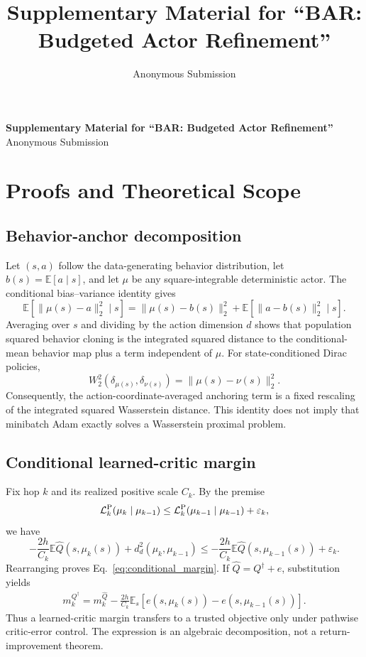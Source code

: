 \documentclass[letterpaper]{article}
\title{Supplementary Material for ``BAR: Budgeted Actor Refinement''}
\author{Anonymous Submission}
\newcommand{\E}{\mathbb E}
\begin{document}
\onecolumn
\begin{center}
{\Large\bfseries Supplementary Material for ``BAR: Budgeted Actor Refinement''}\\[.4em]
{\normalsize Anonymous Submission}
\end{center}
\vspace{1em}

\section{Proofs and Theoretical Scope}
\label{app:proofs}

\subsection{Behavior-anchor decomposition}
Let $(s,a)$ follow the data-generating behavior distribution, let $b(s)=\E[a\mid s]$, and let $\mu$ be any square-integrable deterministic actor. The conditional bias--variance identity gives
\begin{equation}
\E[\|\mu(s)-a\|_2^2\mid s]
=\|\mu(s)-b(s)\|_2^2+\E[\|a-b(s)\|_2^2\mid s].
\end{equation}
Averaging over $s$ and dividing by the action dimension $d$ shows that population squared behavior cloning is the integrated squared distance to the conditional-mean behavior map plus a term independent of $\mu$. For state-conditioned Dirac policies,
\begin{equation}
W_2^2(\delta_{\mu(s)},\delta_{\nu(s)})=\|\mu(s)-\nu(s)\|_2^2.
\end{equation}
Consequently, the action-coordinate-averaged anchoring term is a fixed rescaling of the integrated squared Wasserstein distance. This identity does not imply that minibatch Adam exactly solves a Wasserstein proximal problem.

\subsection{Conditional learned-critic margin}
Fix hop $k$ and its realized positive scale $C_k$. By the premise
\begin{equation}
\mathcal L_k^{\rm P}(\mu_k\mid\mu_{k-1})
\leq \mathcal L_k^{\rm P}(\mu_{k-1}\mid\mu_{k-1})+\varepsilon_k,
\end{equation}
we have
\begin{equation}
-\frac{2h}{C_k}\E\widehat Q(s,\mu_k(s))
+d_d^2(\mu_k,\mu_{k-1})
\leq-\frac{2h}{C_k}\E\widehat Q(s,\mu_{k-1}(s))+\varepsilon_k.
\end{equation}
Rearranging proves Eq.~\eqref{eq:conditional_margin}. If $\widehat Q=Q^\dagger+e$, substitution yields
\begin{equation}
\begin{split}
m_k^{Q^\dagger}=m_k^{\widehat Q}
-\frac{2h}{C_k}\E_s[ e(s,\mu_k(s))-e(s,\mu_{k-1}(s))].
\end{split}
\end{equation}
Thus a learned-critic margin transfers to a trusted objective only under pathwise critic-error control. The expression is an algebraic decomposition, not a return-improvement theorem.
\end{document}
